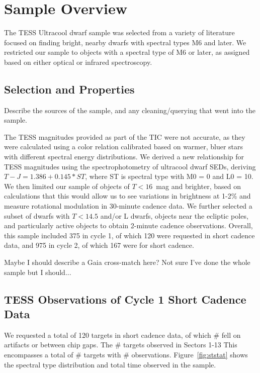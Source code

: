 \documentclass[twocolumn]{aastex62}
\begin{document}
\section{Sample Overview} \label{sec:sample}
The TESS Ultracool dwarf sample was selected from a variety of literature focused on finding bright, nearby dwarfs with spectral types M6 and later. We restricted our sample to objects with a spectral type of M6 or later, as assigned based on either optical or infrared spectroscopy. 

\subsection{Selection and Properties} \label{subsec:samsel}
Describe the sources of the sample, and any cleaning/querying that went into the sample. 

The TESS magnitudes provided as part of the TIC were not accurate, as they were calculated using a color relation calibrated based on warmer, bluer stars with different spectral energy distributions. We derived a new relationship for TESS magnitudes using the spectrophotometry of ultracool dwarf SEDs, deriving $T-J = 1.386 + 0.145*ST$, where ST is spectral type with M0 = 0 and L0 = 10. We then limited our sample of objects of $T < 16$~mag and brighter, based on calculations that this would allow us to see variations in brightness at 1-2\% and measure rotational modulation in 30-minute cadence data. We further selected a subset of dwarfs with $T < 14.5$ and/or L dwarfs, objects near the ecliptic poles, and particularly active objects to obtain 2-minute cadence observations. Overall, this sample included 375 in cycle 1, of which 120 were requested in short cadence data, and 975 in cycle 2, of which 167 were for short cadence. 

Maybe I should describe a Gaia cross-match here? Not sure I've done the whole sample but I should... 

\subsection{TESS Observations of Cycle 1 Short Cadence Data}
We requested a total of 120 targets in short cadence data, of which \# fell on artifacts or between chip gaps. The \# targets observed in Sectors 1-13 This encompasses a total of \# targets with \# observations. Figure~\ref{fig:ststat} shows the spectral type distribution and total time observed in the sample. 
\end{document}
